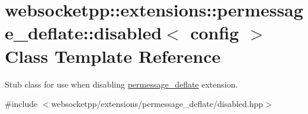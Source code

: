 \hypertarget{classwebsocketpp_1_1extensions_1_1permessage__deflate_1_1disabled}{}\section{websocketpp\+:\+:extensions\+:\+:permessage\+\_\+deflate\+:\+:disabled$<$ config $>$ Class Template Reference}
\label{classwebsocketpp_1_1extensions_1_1permessage__deflate_1_1disabled}


Stub class for use when disabling \hyperlink{namespacewebsocketpp_1_1extensions_1_1permessage__deflate}{permessage\+\_\+deflate} extension.  




{\ttfamily \#include $<$websocketpp/extensions/permessage\+\_\+deflate/disabled.\+hpp$>$}

